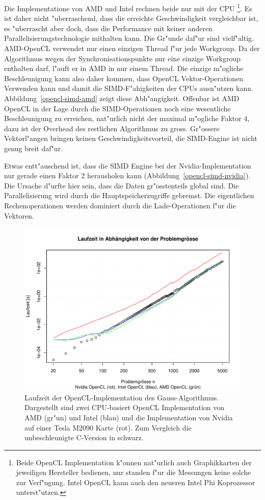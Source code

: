 Die Implementatione von AMD und Intel rechnen beide nur mit der CPU%
\footnote{Beide OpenCL Implementation k"onnen nat"urlich auch Graphikkarten
der jeweiligen Hersteller bedienen, nur standen f"ur die Messungen
keine solche zur Verf"ugung. Intel OpenCL kann auch den neueren Intel Phi
Koprozessor unterst"utzen.}.
Es ist daher nicht "uberraschend, dass die erreichte Geschwindigkeit
vergleichbar ist, es "uberrascht aber doch, dass die Performance mit
keiner anderen Parallelisierungstechnologie mithalten kann.
Die Gr"unde daf"ur sind vielf"altig. AMD-OpenCL verwendet nur einen
einzigen Thread f"ur jede Workgroup.
Da der Algorithmus wegen der Synchronisationspunkte nur eine einzige Workgroup
enthalten darf, l"auft er in AMD in nur einem Thread. Die einzige
m"ogliche Beschleunigung kann also daher kommen, dass OpenCL Vektor-Operationen
Verwenden kann und damit die SIMD-F"ahigkeiten der CPUs ausn"utzen kann.
Abbildung~\ref{opencl-simd-amd} zeigt diese Abh"angigkeit.
Offenbar ist AMD OpenCL in der Lage durch die SIMD-Operationen noch eine 
wesentliche Beschleunigung zu erreichen, nat"urlich nicht der maximal
m"ogliche Faktor 4, dazu ist der Overhead des restlichen Algorithmus
zu gross.
Gr"ossere Vektorl"angen bringen keinen Geschwindigkeitsvorteil, die
SIMD-Engine ist nicht genug breit daf"ur.

Etwas entt"auschend ist, dass die SIMD Engine bei der Nvidia-Implementation 
nur gerade einen Faktor 2 herausholen kann (Abbildung~\ref{opencl-simd-nvidia}).
Die Ursache d"urfte hier sein, dass die Daten gr"osstenteils global sind.
Die Parallelisierung wird durch die Hauptspeicherzugriffe gebremst.
Die eigentlichen Rechenoperationen werden dominiert durch die Lade-Operationen
f"ur die Vektoren.

\begin{figure}
\begin{center}
\includegraphics[width=\hsize]{images/gauss-opencl.pdf}
\end{center}
\caption{Laufzeit der OpenCL-Implementation des Gauss-Algorithmus.
Dargestellt sind
zwei CPU-basiert OpenCL Implementation von AMD (gr"un) und Intel (blau)
und die Implementation von Nvidia auf einer Tesla M2090 Karte (rot).
Zum Vergleich die unbeschleunigte C-Version in schwarz.
\label{opencl-results}}
\end{figure}

